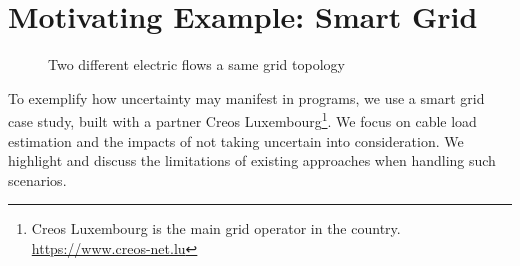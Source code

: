 \section{Motivating Example: Smart Grid}
\label{sec:lux-sg-scenario}

\begin{figure}[ht]
	\centering
	\hfill
	\caption{Two different electric flows a same grid topology}
	\label{fig:intro-global}
\end{figure}


To exemplify how uncertainty may manifest in programs, we use a smart grid case study, built with a partner Creos Luxembourg\footnote{Creos Luxembourg is the main grid operator in the country. \url{https://www.creos-net.lu}}. 
We focus on cable load estimation and the impacts of not taking uncertain into consideration. 
We highlight and discuss the limitations of existing approaches when handling such scenarios.

